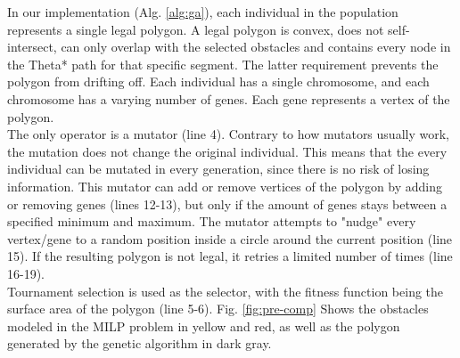 In our implementation (Alg. \ref{alg:ga}), each individual in the population represents a single legal polygon. A legal polygon is convex, does not self-intersect, can only overlap with the selected obstacles and contains every node in the Theta* path for that specific segment. The latter requirement prevents the polygon from drifting off. Each individual has a single chromosome, and each chromosome has a varying number of genes. Each gene represents a vertex of the polygon.\\
The only operator is a mutator (line 4). Contrary to how mutators usually work, the mutation does not change the original individual. This means that the every individual can be mutated in every generation, since there is no risk of losing information. This mutator can add or remove vertices of the polygon by adding or removing genes (lines 12-13), but only if the amount of genes stays between a specified minimum and maximum. The mutator attempts to "nudge" every vertex/gene to a random position inside a circle around the current position (line 15). If the resulting polygon is not legal, it retries a limited number of times (line 16-19). \\
Tournament selection is used as the selector, with the fitness function being the surface area of the polygon (line 5-6). Fig. \ref{fig:pre-comp} Shows the obstacles modeled in the MILP problem in yellow and red, as well as the polygon generated by the genetic algorithm in dark gray.




